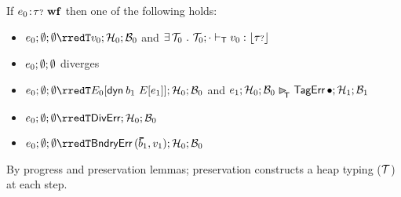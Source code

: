 
\begin{theorem}\label{T-S-type-soundness}
  If\/ $e_0\!:\!{\tau{\scriptstyle ?}}~\mathbf{wf}$
  then one of the following holds:
  \begin{itemize}
    \item $\conf{\sexpr_0}{\semptymap}{\semptymap} \rredT
      \conf{\svalue_0}{\vstore_0}{\bstore_0}$
      and\/ $\exists\,\mathcal{T}_0~.~\mathcal{T}_0; {\cdot} \vdash_{\mathsf{T}} v_0 : \lfloor {\tau{\scriptstyle ?}} \rfloor$
    \item $e_0; \emptyset; \emptyset$ diverges
    \item $\conf{\sexpr_0}{\semptymap}{\semptymap} \rredT
      \conf{\ctx_0[\edynb{\sbnd_1}{\ctx[\sexpr_1]}]}{\vstore_0}{\bstore_0}$
      and\/ $\conf{\sexpr_1}{\vstore_0}{\bstore_0} \nredTX \conf{\tagerrorD}{\vstore_1}{\bstore_1}$
    \item $\conf{\sexpr_0}{\semptymap}{\semptymap} \rredT \conf{\divisionbyzeroerror}{\vstore_0}{\bstore_0}$
    \item $\conf{\sexpr_0}{\semptymap}{\semptymap} \rredT \conf{\boundaryerror{\sblist_1}{\svalue_1}}{\vstore_0}{\bstore_0}$
  \end{itemize}
\end{theorem}
\begin{proofsketch}
  By progress and preservation lemmas; preservation constructs a heap typing ($\mathcal{T}$) at each step.
\end{proofsketch}

